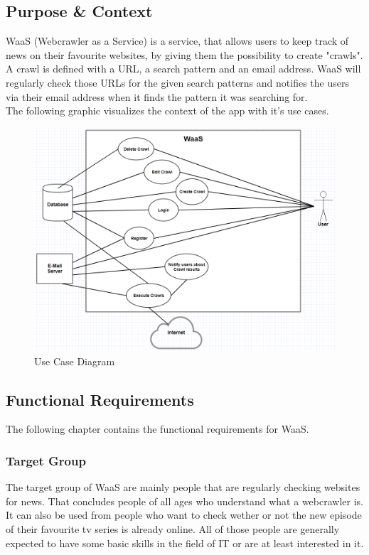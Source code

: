 \documentclass[titlepage, 12pt]{article}
\begin{document}
\subsection{Purpose \& Context}

WaaS (Webcrawler as a Service) is a service, that allows users to keep track of news on their favourite websites, by giving them the possibility to create "crawls". A crawl is defined with a URL, a search pattern and an email address. WaaS will regularly check those URLs for the given search patterns and notifies the users via their email address when it finds the pattern it was searching for.
\medskip \\
The following graphic visualizes the context of the app with it's use cases.
\begin{figure}[H]
  \includegraphics[width=0.95\linewidth]{UseCaseDiagram.PNG}
  \caption{Use Case Diagram}
  \label{fig:useCaseDiagram}
\end{figure}

\subsection{Functional Requirements}

The following chapter contains the functional requirements for WaaS.

\subsubsection{Target Group}

The target group of WaaS are mainly people that are regularly checking websites for news. That concludes people of all ages who understand what a webcrawler is. It can also be used from people who want to check wether or not the new episode of their favourite tv series is already online. All of those people are generally expected to have some basic skills in the field of IT or are at least interested in it.
\end{document}
